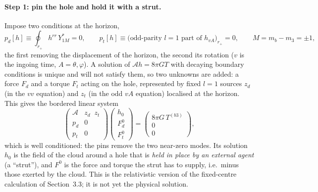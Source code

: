 \documentclass[11pt]{article}
\begin{document}
\paragraph{Step 1: pin the hole and hold it with a strut.} Impose two conditions at the horizon,
\begin{equation}
p_d[h]\equiv\oint_{r_+}\!\!h^{rr}\,Y^*_{1M}=0,\qquad p_t[h]\equiv\big(\text{odd-parity }l=1\text{ part of }h_{vA}\big)_{r_+}=0,\qquad M=m_b-m_3=\pm1,
\end{equation}
the first removing the displacement of the horizon, the second its rotation ($v$ is the ingoing time, $A=\theta,\varphi$). A solution
of $\mathcal A h=8\pi GT$ with decaying boundary conditions is unique and will not satisfy them, so two unknowns are added: a force $F_d$ and a
torque $F_t$ acting on the hole, represented by fixed $l=1$ sources $z_d$ (in the $vv$ equation) and $z_t$ (in the odd $vA$ equation)
localised at the horizon. This gives the bordered linear system
\begin{equation}
\begin{pmatrix}\mathcal A & z_d\;\;z_t\\[2pt] p_d & 0\\ p_t & 0\end{pmatrix}
\begin{pmatrix}h_0\\ F^0_d\\ F^0_t\end{pmatrix}=\begin{pmatrix}8\pi G\,T^{(b3)}\\ 0\\ 0\end{pmatrix}, \label{eq:bordered}
\end{equation}
which is well conditioned: the pins remove the two near-zero modes. Its solution $h_0$ is the field of the cloud around a hole that is
\emph{held in place by an external agent} (a ``strut''), and $F^0$ is the force and torque the strut has to supply, i.e.\ minus those
exerted by the cloud. This is the relativistic version of the fixed-centre calculation of Section~3.3; it is not yet the physical solution.
\end{document}

